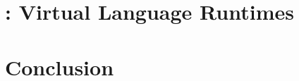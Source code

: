 \documentclass[a4paper,11pt,twoside]{include/ThesisStyle}
\begin{document}
\renewcommand{\baselinestretch}{1}\normalsize
\tableofcontents

\renewcommand{\baselinestretch}{1.2}\normalsize
\mainmatter
{}





\part{\VTT: Virtual Language Runtimes}





%

\part{Conclusion}








\appendix



\thispagestyle{empty}
\end{document}
